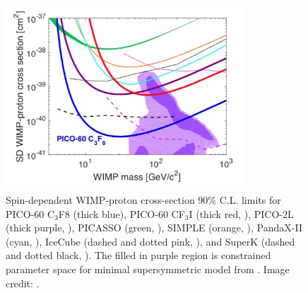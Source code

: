 \begin{figure}
 \centering
 \includegraphics[width=0.8\textwidth]{spin_dependent_limits}
 \caption{Spin-dependent WIMP-proton cross-section 90\% C.L. limits for PICO-60 C$_{3}$F${8}$ (thick blue), PICO-60 CF$_{3}$I (thick red,
 ), PICO-2L (thick purple, ), PICASSO (green, ), SIMPLE (orange,
 ), PandaX-II (cyan, ), IceCube (dashed and dotted pink, ), and SuperK (dashed and
 dotted black, ).  The filled in purple region is constrained parameter space for minimal
 supersymmetric model from .
 Image credit: .}
 \label{fig:sd_limits}
\end{figure}


